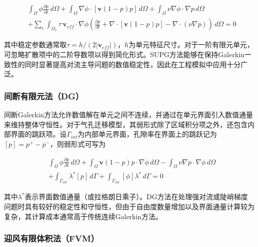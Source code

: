 \begin{equation}
	\begin{aligned}
		&
		\int_\Omega
		\phi
		\frac{\partial p}{\partial t}
		\,d\Omega
		+
		\int_\Omega
		\nabla\phi\cdot[\mathbf v(1-p)p]
		\,d\Omega
		+
		\int_\Omega
		\nu\nabla\phi\cdot\nabla p
		\,d\Omega
		\\
		&
		+
		\sum_e
		\int_{\Omega_e}
		\tau\,\mathbf v_{eff}\cdot\nabla\phi
		\left(
		\frac{\partial p}{\partial t}
		+
		\nabla\cdot[\mathbf v(1-p)p]
		-
		\nabla\cdot(\nu\nabla p)
		\right)
		\,d\Omega
		=0 
	\end{aligned}
	\label{eq:supg_weak}
\end{equation}

其中稳定参数通常取$\tau=h/(2|\mathbf v_{eff}|)$，$h$为单元特征尺寸。对于一阶有限元单元，可忽略扩散项中的二阶导数项以得到简化形式。SUPG方法能够在保持Galerkin一致性的同时显著提高对流主导问题的数值稳定性，因此在工程模拟中应用十分广泛。

\subsubsection{间断有限元法（DG）}

间断Galerkin方法允许数值解在单元之间不连续，并通过在单元界面引入数值通量来维持整体守恒性\cite{shuonanStabilizedFiniteElement2024}。对于气孔迁移模型，其弱形式除了区域积分项之外，还包含内部界面的跳跃项。设$\Gamma_{int}$为内部单元界面，孔隙率在界面上的跳跃记为$[p]=p^+-p^-$，则弱形式可写为

\begin{equation}
	\begin{aligned}
		&
		\int_\Omega
		\phi
		\frac{\partial p}{\partial t}
		\,d\Omega
		+
		\int_\Omega
		\mathbf v(1-p)p\cdot\nabla\phi
		\,d\Omega
		-
		\int_\Omega
		\nu\nabla p\cdot\nabla\phi
		\,d\Omega
		\\
		&
		+
		\int_{\Gamma_{int}}
		\lambda^*[p]\,d\Gamma
		+
		\int_{\Gamma_{int}}
		[\phi]\lambda^*\,d\Gamma
		=0 
	\end{aligned}
	\label{eq:dg_weak}
\end{equation}

其中$\lambda^*$表示界面数值通量（或拉格朗日乘子）。DG方法在处理强对流或陡峭梯度问题时具有较好的稳定性和守恒性，但由于自由度数量增加以及界面通量计算较为复杂，其计算成本通常高于传统连续Galerkin方法。

\subsubsection{迎风有限体积法（FVM）}

